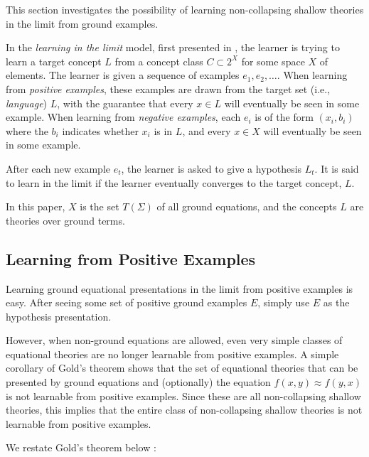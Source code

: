 This section investigates the possibility of learning non-collapsing shallow theories in the limit from ground examples. 

In the \emph{learning in the limit} model, first presented in \cite{gold67}, the learner is trying to learn a target concept $L$ from a concept class $C \subset 2^X$ for some space $X$ of elements. 
The learner is given a sequence of examples $e_1, e_2, \dots$.
When learning from \emph{positive examples}, these examples are drawn from the target set (i.e., \emph{language}) $L$, with the guarantee that every $x \in L$ will eventually be seen in some example.
When learning from \emph{negative examples}, each $e_i$ is of the form $(x_i, b_i)$ where the $b_i$ indicates whether $x_i$ is in $L$, and every $x \in X$ will eventually be seen in some example.

After each new example $e_t$, the learner is asked to give a hypothesis $L_t$. 
It is said to learn in the limit if the learner eventually converges to the target concept, $L$. 

In this paper, $X$ is the set $T(\Sigma)$ of all ground equations, and the concepts $L$ are theories over ground terms. 

\subsection{Learning from Positive Examples}

Learning ground equational presentations in the limit from positive examples is easy. 
After seeing some set of positive ground examples $E$, simply use $E$ as the hypothesis presentation. %

However, when non-ground equations are allowed, even very simple classes of equational theories are no longer learnable from positive examples. 
A simple corollary of Gold's theorem shows that the set of equational theories that can be presented by ground equations and (optionally) the equation $f(x,y) \approx f(y,x)$ is not learnable from positive examples.  %
Since these are all non-collapsing shallow theories, this implies that the entire class of non-collapsing shallow theories is not learnable from positive examples.

We restate Gold's theorem below \cite{gold67}:

